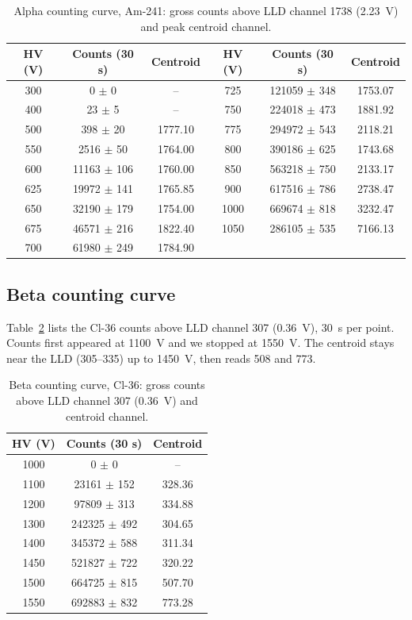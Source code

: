 \documentclass[12pt]{article}
\begin{document}
\begin{table}[!htbp]
\centering\small\setlength{\tabcolsep}{3pt}
\begin{tabular}{ccc|ccc}
\toprule
\textbf{HV (V)} & \textbf{Counts (30 s)} & \textbf{Centroid} & \textbf{HV (V)} & \textbf{Counts (30 s)} & \textbf{Centroid} \\
\midrule
300 & 0 $\pm$ 0 & -- & 725 & 121059 $\pm$ 348 & 1753.07 \\
400 & 23 $\pm$ 5 & -- & 750 & 224018 $\pm$ 473 & 1881.92 \\
500 & 398 $\pm$ 20 & 1777.10 & 775 & 294972 $\pm$ 543 & 2118.21 \\
550 & 2516 $\pm$ 50 & 1764.00 & 800 & 390186 $\pm$ 625 & 1743.68 \\
600 & 11163 $\pm$ 106 & 1760.00 & 850 & 563218 $\pm$ 750 & 2133.17 \\
625 & 19972 $\pm$ 141 & 1765.85 & 900 & 617516 $\pm$ 786 & 2738.47 \\
650 & 32190 $\pm$ 179 & 1754.00 & 1000 & 669674 $\pm$ 818 & 3232.47 \\
675 & 46571 $\pm$ 216 & 1822.40 & 1050 & 286105 $\pm$ 535 & 7166.13 \\
700 & 61980 $\pm$ 249 & 1784.90 & & & \\
\bottomrule
\end{tabular}
\caption{Alpha counting curve, Am-241: gross counts above LLD channel 1738 (2.23~V) and peak centroid channel.}
\label{tab:rawalpha}
\end{table}

\subsection{Beta counting curve}

Table~\ref{tab:rawbeta} lists the Cl-36 counts above LLD channel 307 (0.36~V), 30~s per point. Counts first appeared at 1100~V and we stopped at 1550~V. The centroid stays near the LLD (305--335) up to 1450~V, then reads 508 and 773.

\begin{table}[!htbp]
\centering\small
\begin{tabular}{ccc}
\toprule
\textbf{HV (V)} & \textbf{Counts (30 s)} & \textbf{Centroid} \\
\midrule
1000 & 0 $\pm$ 0 & -- \\
1100 & 23161 $\pm$ 152 & 328.36 \\
1200 & 97809 $\pm$ 313 & 334.88 \\
1300 & 242325 $\pm$ 492 & 304.65 \\
1400 & 345372 $\pm$ 588 & 311.34 \\
1450 & 521827 $\pm$ 722 & 320.22 \\
1500 & 664725 $\pm$ 815 & 507.70 \\
1550 & 692883 $\pm$ 832 & 773.28 \\
\bottomrule
\end{tabular}
\caption{Beta counting curve, Cl-36: gross counts above LLD channel 307 (0.36~V) and centroid channel.}
\label{tab:rawbeta}
\end{table}
\end{document}
